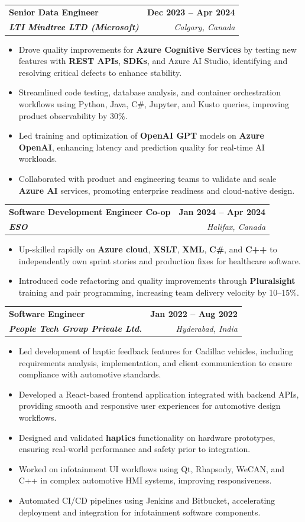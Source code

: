 \documentclass[letterpaper,11pt]{article}
\makeatletter
\newcommand{\resumeItem}[1]{
  \item\small{
    {#1 \vspace{-2pt}}
  }
}
\newcommand{\resumeSubheading}[4]{
  \vspace{-2pt}\item
    \begin{tabular*}{1.0\textwidth}[t]{l@{\extracolsep{\fill}}r}
      \textbf{#1} & \textbf{\small #2} \\
      \textit{\small#3} & \textit{\small #4} \\
    \end{tabular*}\vspace{-7pt}
}
\newcommand{\resumeItemListStart}{\begin{itemize}}
\newcommand{\resumeItemListEnd}{\end{itemize}\vspace{-5pt}}
\makeatother
\begin{document}
    \resumeSubheading
      {\textbf{Senior Data Engineer}}{\textbf{Dec 2023 -- Apr 2024}}
      {\textbf{LTI Mindtree LTD (Microsoft)}}{Calgary, Canada}
      \resumeItemListStart
        \resumeItem{Drove quality improvements for \textbf{Azure Cognitive Services} by testing new features with \textbf{REST APIs}, \textbf{SDKs}, and Azure AI Studio, identifying and resolving critical defects to enhance stability.}
        \resumeItem{Streamlined code testing, database analysis, and container orchestration workflows using Python, Java, C\#, Jupyter, and Kusto queries, improving product observability by 30\%.}
        \resumeItem{Led training and optimization of \textbf{OpenAI GPT} models on \textbf{Azure OpenAI}, enhancing latency and prediction quality for real-time AI workloads.}
        \resumeItem{Collaborated with product and engineering teams to validate and scale \textbf{Azure AI} services, promoting enterprise readiness and cloud-native design.}
      \resumeItemListEnd
    
    \resumeSubheading
      {\textbf{Software Development Engineer Co-op}}{\textbf{Jan 2024 -- Apr 2024}}
      {\textbf{ESO}}{Halifax, Canada}
      \resumeItemListStart
        \resumeItem{Up-skilled rapidly on \textbf{Azure cloud}, \textbf{XSLT}, \textbf{XML}, \textbf{C\#}, and \textbf{C++} to independently own sprint stories and production fixes for healthcare software.}
        \resumeItem{Introduced code refactoring and quality improvements through \textbf{Pluralsight} training and pair programming, increasing team delivery velocity by 10–15\%.}
      \resumeItemListEnd

    \resumeSubheading
      {\textbf{Software Engineer}}{\textbf{Jan 2022 -- Aug 2022}}
      {\textbf{People Tech Group Private Ltd.}}{Hyderabad, India}
      \resumeItemListStart
        \resumeItem{Led development of haptic feedback features for Cadillac vehicles, including requirements analysis, implementation, and client communication to ensure compliance with automotive standards.}
        \resumeItem{Developed a React-based frontend application integrated with backend APIs, providing smooth and responsive user experiences for automotive design workflows.}
        \resumeItem{Designed and validated \textbf{haptics} functionality on hardware prototypes, ensuring real-world performance and safety prior to integration.}
        \resumeItem{Worked on infotainment UI workflows using Qt, Rhapsody, WeCAN, and C++ in complex automotive HMI systems, improving responsiveness.}
        \resumeItem{Automated CI/CD pipelines using Jenkins and Bitbucket, accelerating deployment and integration for infotainment software components.}
      \resumeItemListEnd
\end{document}
